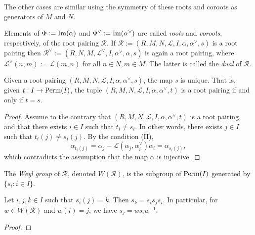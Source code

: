 \begin{example}
    The other cases are similar using the symmetry of these roots and coroots as generators of $M$ and $N$.
\end{example}


Elements of $\Phi := {\rm Im}(\alpha)$ and $\Phi^\vee := {\rm Im}(\alpha^\vee)$ are called {\it roots} and {\it coroots}, 
respectively, of the root pairing $\mathcal{R}$. If $\mathcal{R} := (R,M,N,\mathcal{L},I,\alpha, \alpha^\vee,s)$ is 
a root pairing then $\mathcal{R}^\vee := (R,N,M,\mathcal{L}^\vee,I,\alpha^\vee, \alpha,s)$ is again 
a root pairing, where $\mathcal{L}^\vee (n,m) := \mathcal{L}(m,n)$ for all $n \in N,m \in M$. The 
latter is called the {\it dual} of $\mathcal{R}$. 

\begin{lemma}
    \leanok
    Given a root pairing $(R,M,N,\mathcal{L},I,\alpha, \alpha^\vee, s)$, the map $s$ is unique. 
    That is, given $t : I \to {\rm Perm}(I)$, the tuple $(R,M,N,\mathcal{L},I,\alpha, \alpha^\vee, t)$
    is a root pairing if and only if $t = s$.
\end{lemma}
\begin{proof}
    \leanok
    Assume to the contrary that $(R,M,N,\mathcal{L},I,\alpha, \alpha^\vee, t)$ is a root pairing, and that 
    there exists $i \in I$ such that $t_i \neq s_i$. In other words, there exists $j \in I$ such that
    $t_i(j) \neq s_i(j)$. By the condition (II),
    \[
        \alpha_{t_i(j)} = \alpha_j - \mathcal{L}(\alpha_j,\alpha^\vee_i)\alpha_i = \alpha_{s_i(j)},
    \]
    which contradicts the assumption that the map $\alpha$ is injective.
\end{proof}


\begin{definition}
    The {\it Weyl group} of $\mathcal{R}$, denoted $W(\mathcal{R})$, is the subgroup of ${\rm Perm}(I)$ 
    generated by $\{s_i : i \in I\}$. 
\end{definition}
\begin{lemma}
    Let $i,j,k \in I$ such that $s_i(j) = k$. Then $s_k = s_is_js_i$. In particular, for 
    $w \in W(\mathcal{R})$ and $w(i) = j$, we have $s_j = ws_iw^{-1}$. 
\end{lemma}
\begin{proof}

\end{proof}

